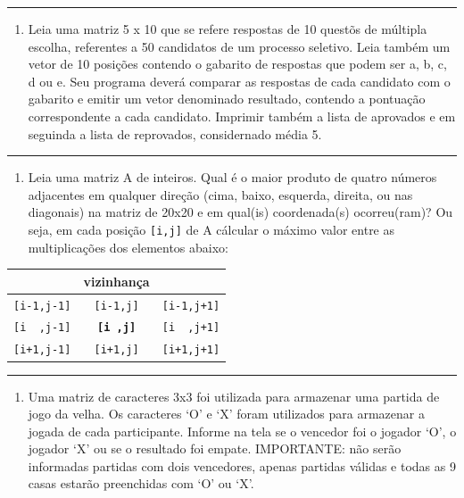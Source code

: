 \documentclass[12pt,a4paper]{article}
\renewcommand{\linethickness}{0.05em}
\providecommand{\tightlist}{%
      \setlength{\itemsep}{0pt}\setlength{\parskip}{0pt}}
\begin{document}
    \begin{center}\rule{0.5\linewidth}{\linethickness}\end{center}

\begin{enumerate}
\def\labelenumi{\arabic{enumi}.}
\setcounter{enumi}{4}
\tightlist
\item
  Leia uma matriz 5 x 10 que se refere respostas de 10 questõs de
  múltipla escolha, referentes a 50 candidatos de um processo seletivo.
  Leia também um vetor de 10 posições contendo o gabarito de respostas
  que podem ser a, b, c, d ou e. Seu programa deverá comparar as
  respostas de cada candidato com o gabarito e emitir um vetor
  denominado resultado, contendo a pontuação correspondente a cada
  candidato. Imprimir também a lista de aprovados e em seguinda a lista
  de reprovados, considernado média 5.
\end{enumerate}

    \begin{center}\rule{0.5\linewidth}{\linethickness}\end{center}

\begin{enumerate}
\def\labelenumi{\arabic{enumi}.}
\setcounter{enumi}{5}
\tightlist
\item
  Leia uma matriz A de inteiros. Qual é o maior produto de quatro
  números adjacentes em qualquer direção (cima, baixo, esquerda,
  direita, ou nas diagonais) na matriz de 20x20 e em qual(is)
  coordenada(s) ocorreu(ram)? Ou seja, em cada posição
  \texttt{{[}i,j{]}} de A cálcular o máximo valor entre as
  multiplicações dos elementos abaixo:
\end{enumerate}

\begin{longtable}[]{@{}ccc@{}}
\toprule
& vizinhança &\tabularnewline
\midrule
\endhead
\texttt{{[}i-1,j-1{]}} & \texttt{{[}i-1,j{]}} &
\texttt{{[}i-1,j+1{]}}\tabularnewline
\texttt{{[}i\ \ ,j-1{]}} & \textbf{\texttt{{[}i\ ,j{]}}} &
\texttt{{[}i\ \ ,j+1{]}}\tabularnewline
\texttt{{[}i+1,j-1{]}} & \texttt{{[}i+1,j{]}} &
\texttt{{[}i+1,j+1{]}}\tabularnewline
\bottomrule
\end{longtable}

    \begin{center}\rule{0.5\linewidth}{\linethickness}\end{center}

\begin{enumerate}
\def\labelenumi{\arabic{enumi}.}
\setcounter{enumi}{6}
\tightlist
\item
  Uma matriz de caracteres 3x3 foi utilizada para armazenar uma partida
  de jogo da velha. Os caracteres `O' e `X' foram utilizados para
  armazenar a jogada de cada participante. Informe na tela se o vencedor
  foi o jogador `O', o jogador `X' ou se o resultado foi empate.
  IMPORTANTE: não serão informadas partidas com dois vencedores, apenas
  partidas válidas e todas as 9 casas estarão preenchidas com `O' ou
  `X'.
\end{enumerate}
\end{document}
